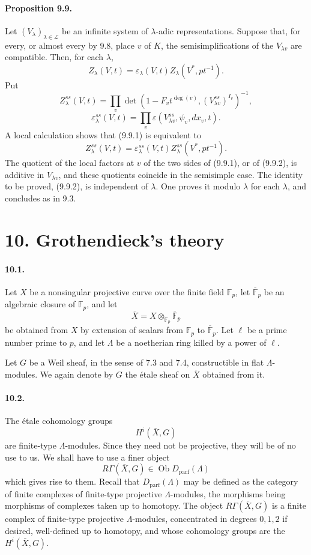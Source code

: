 \documentclass[10pt]{article}
\newcommand{\F}{\mathbb F}
\providecommand{\LLL}{\mathcal L}
\providecommand{\Dparf}{D_{\mathrm{parf}}}
\begin{document}
\paragraph{Proposition 9.9.} Let $(V_\lambda)_{\lambda\in\LLL}$ be an infinite system of $\lambda$-adic representations. Suppose that, for every, or almost every by 9.8, place $v$ of $K$, the semisimplifications of the $V_{\lambda v}$ are compatible. Then, for each $\lambda$,
\[
\tag{9.9.1}
Z_\lambda(V,t)=\varepsilon_\lambda(V,t)Z_\lambda(V^*,pt^{-1}).
\]
Put
\[
Z_\lambda^{ss}(V,t)=
\prod_v\det(1-F_vt^{\deg(v)},(V_{\lambda v}^{ss})^{I_v})^{-1},
\]
\[
\varepsilon_\lambda^{ss}(V,t)=
\prod_v\varepsilon(V_{\lambda v}^{ss},\psi_v,dx_v,t).
\]
A local calculation shows that (9.9.1) is equivalent to
\[
\tag{9.9.2}
Z_\lambda^{ss}(V,t)=
\varepsilon_\lambda^{ss}(V,t)Z_\lambda^{ss}(V^*,pt^{-1}).
\]
The quotient of the local factors at $v$ of the two sides of (9.9.1), or of (9.9.2), is additive in $V_{\lambda v}$, and these quotients coincide in the semisimple case. The identity to be proved, (9.9.2), is independent of $\lambda$. One proves it modulo $\lambda$ for each $\lambda$, and concludes as in 9.3.




\section*{10. Grothendieck's theory}

\paragraph{10.1.} Let \(X\) be a nonsingular projective curve over the finite field \(\F_p\), let \(\overline{\F}_p\) be an algebraic closure of \(\F_p\), and let
\[
\overline X=X\otimes_{\F_p}\overline{\F}_p
\]
be obtained from \(X\) by extension of scalars from \(\F_p\) to \(\overline{\F}_p\). Let \(\ell\) be a prime number prime to \(p\), and let \(\Lambda\) be a noetherian ring killed by a power of \(\ell\).

Let \(G\) be a Weil sheaf, in the sense of 7.3 and 7.4, constructible in flat \(\Lambda\)-modules. We again denote by \(G\) the étale sheaf on \(\overline X\) obtained from it.

\paragraph{10.2.} The étale cohomology groups
\[
H^i(\overline X,G)
\]
are finite-type \(\Lambda\)-modules. Since they need not be projective, they will be of no use to us. We shall have to use a finer object
\[
R\Gamma(\overline X,G)\in\operatorname{Ob}\Dparf(\Lambda)
\]
which gives rise to them. Recall that \(\Dparf(\Lambda)\) may be defined as the category of finite complexes of finite-type projective \(\Lambda\)-modules, the morphisms being morphisms of complexes taken up to homotopy. The object \(R\Gamma(\overline X,G)\) is a finite complex of finite-type projective \(\Lambda\)-modules, concentrated in degrees \(0,1,2\) if desired, well-defined up to homotopy, and whose cohomology groups are the \(H^i(\overline X,G)\).
\end{document}
